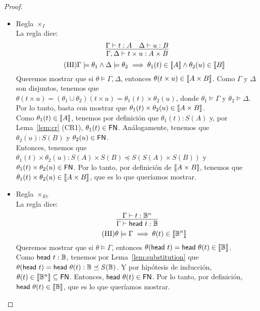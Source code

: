 \begin{proof}
\begin{itemize}
    \item Regla \( \times_I \)
    \\ La regla dice:
    \[ \infer{\Gamma, \Delta \vdash t \times u : A \times B}{\Gamma \vdash t : A & \Delta \vdash u : B} \]
    \[
      \tag{HI}
      \Gamma \models \theta_1 \land \Delta \models \theta_2
      \implies \theta_1(t) \in \llbracket A\rrbracket \land \theta_2(u) \in \llbracket B\rrbracket
    \]
    Queremos mostrar que si \( \theta \models \Gamma, \Delta \), entonces \( \theta(t \times u) \in \llbracket A \times B\rrbracket \).
    Como \( \Gamma \) y \( \Delta \) son disjuntos, tenemos que \( \theta(t \times u) = (\theta_1 \cup \theta_2)(t \times u) = \theta_1(t) \times \theta_2(u) \), donde \( \theta_1 \models \Gamma \) y \( \theta_2 \models \Delta \).
    Por lo tanto, basta con mostrar que \( \theta_1(t) \times \theta_2(u) \in \llbracket A \times B\rrbracket \).
    \\ Como \( \theta_1(t) \in \llbracket A\rrbracket \), tenemos por definición que \( \theta_1(t) : S(A) \) y, por Lema~\ref{lem:cr} (CR1), \( \theta_1(t) \in \mathsf{FN} \). Análogamente, tenemos que \( \theta_2(u) : S(B) \) y \( \theta_2(u) \in \mathsf{FN} \).
    \\ Entonces, tenemos que \( \theta_1(t) \times \theta_2(u) : S(A) \times S(B) \preceq S(S(A) \times S(B)) \) y \( \theta_1(t) \times \theta_2(u) \in \mathsf{FN} \). Por lo tanto, por definición de \( \llbracket A \times B\rrbracket \), tenemos que \( \theta_1(t) \times \theta_2(u) \in \llbracket A \times B\rrbracket \), que es lo que queríamos mostrar.

    \item Regla \( \times_{Er} \)
    \\ La regla dice:
    \[ \infer{\Gamma \vdash \head{t} : \qubittype}{\Gamma \vdash t : \qubittype^n } \]
    \[ \tag{HI} \theta \models \Gamma \implies \theta(t) \in \llbracket\mathbb{B}^n\rrbracket \]
    Queremos mostrar que si \( \theta \models \Gamma \), entonces \( \theta(\mathsf{head}~t) = \mathsf{head}~\theta(t) \in \llbracket\mathbb{B}\rrbracket \).
    \\ Como \( \mathsf{head}~t : \mathbb{B} \), tenemos por Lema~\ref{lem:substitution} que \( \theta(\mathsf{head}~t) = \mathsf{head}~\theta(t) : \mathbb{B} \preceq S(\mathbb{B}) \). Y por hipótesis de inducción, \( \theta(t) \in \llbracket\mathbb{B}^n\rrbracket \subseteq \mathsf{FN} \). Entonces, \( \mathsf{head}~\theta(t) \in \mathsf{FN} \). Por lo tanto, por definición, \( \mathsf{head}~\theta(t) \in \llbracket\mathbb{B}\rrbracket \), que es lo que queríamos mostrar.


\end{itemize}
\end{proof}
